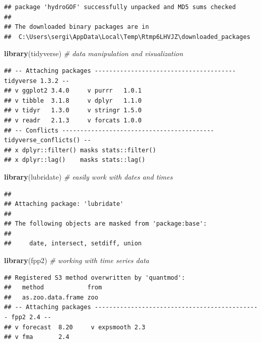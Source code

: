 \documentclass[
]{article}
\newenvironment{Shaded}{\begin{snugshade}}{\end{snugshade}}
\newcommand{\CommentTok}[1]{\textcolor[rgb]{0.56,0.35,0.01}{\textit{#1}}}
\newcommand{\FunctionTok}[1]{\textcolor[rgb]{0.13,0.29,0.53}{\textbf{#1}}}
\newcommand{\NormalTok}[1]{#1}
\begin{document}
\begin{verbatim}
## package 'hydroGOF' successfully unpacked and MD5 sums checked
## 
## The downloaded binary packages are in
##  C:\Users\sergi\AppData\Local\Temp\Rtmp6LHVJZ\downloaded_packages
\end{verbatim}

\begin{Shaded}
\begin{Highlighting}[]
\FunctionTok{library}\NormalTok{(tidyverse)      }\CommentTok{\# data manipulation and visualization}
\end{Highlighting}
\end{Shaded}

\begin{verbatim}
## -- Attaching packages --------------------------------------- tidyverse 1.3.2 --
## v ggplot2 3.4.0     v purrr   1.0.1
## v tibble  3.1.8     v dplyr   1.1.0
## v tidyr   1.3.0     v stringr 1.5.0
## v readr   2.1.3     v forcats 1.0.0
## -- Conflicts ------------------------------------------ tidyverse_conflicts() --
## x dplyr::filter() masks stats::filter()
## x dplyr::lag()    masks stats::lag()
\end{verbatim}

\begin{Shaded}
\begin{Highlighting}[]
\FunctionTok{library}\NormalTok{(lubridate)      }\CommentTok{\# easily work with dates and times}
\end{Highlighting}
\end{Shaded}

\begin{verbatim}
## 
## Attaching package: 'lubridate'
## 
## The following objects are masked from 'package:base':
## 
##     date, intersect, setdiff, union
\end{verbatim}

\begin{Shaded}
\begin{Highlighting}[]
\FunctionTok{library}\NormalTok{(fpp2)           }\CommentTok{\# working with time series data}
\end{Highlighting}
\end{Shaded}

\begin{verbatim}
## Registered S3 method overwritten by 'quantmod':
##   method            from
##   as.zoo.data.frame zoo 
## -- Attaching packages ---------------------------------------------- fpp2 2.4 --
## v forecast  8.20     v expsmooth 2.3 
## v fma       2.4
\end{verbatim}
\end{document}
